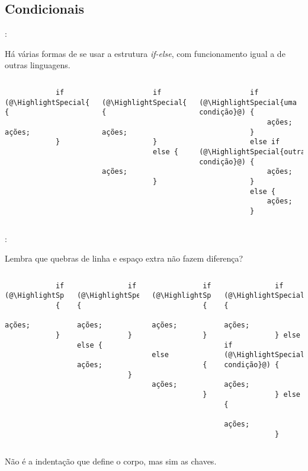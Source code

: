 \subsection{Condicionais}


\begin{frame}[fragile]{\insertsection: \insertsubsection}

	Há várias formas de se usar a estrutura \textit{if-else}, com funcionamento igual a de outras linguagens.
	\begin{columns}[t]
		\begin{verbatim}
			if (@\HighlightSpecial{condição}@) {
				ações;
			}
		\end{verbatim}

		\begin{verbatim}
			if (@\HighlightSpecial{condição}@) {
				ações;
			}
			else {
				ações;
			}
		\end{verbatim}

		\begin{verbatim}
			if (@\HighlightSpecial{uma condição}@) {
				ações;
			}
			else if (@\HighlightSpecial{outra condição}@) {
				ações;
			}
			else {
				ações;
			}
		\end{verbatim}
	\end{columns}

\end{frame}


\begin{frame}[fragile]{\insertsection: \insertsubsection}

	Lembra que quebras de linha e espaço extra não fazem diferença?
	\begin{columns}[t]
		\begin{verbatim}
			if (@\HighlightSpecial{condição}@)
			{
				ações;
			}
		\end{verbatim}

		\vspace{-\medskipamount}
		\begin{verbatim}
			if (@\HighlightSpecial{condição}@) {
				ações;
			} else {
				ações;
			}
		\end{verbatim}

		\begin{verbatim}
			if (@\HighlightSpecial{condição}@)
			{
				ações;
			}
			else
			{
				ações;
			}
		\end{verbatim}

		\begin{verbatim}
			if (@\HighlightSpecial{condição}@) {
				ações;
			} else if (@\HighlightSpecial{outra condição}@) {
				ações;
			} else {
				ações;
			}
		\end{verbatim}
	\end{columns}
	Não é a indentação que define o corpo, mas sim as chaves.

\end{frame}


